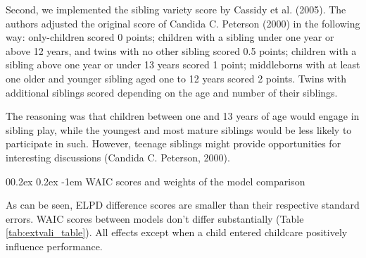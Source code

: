 \documentclass[
  man,floatsintext]{apa6}
\makeatletter
\let\oldparagraph\paragraph
\renewcommand{\paragraph}[1]{\oldparagraph{#1}\mbox{}}
\renewcommand{\paragraph}{\@startsection{paragraph}{4}{\parindent}%
  {0\baselineskip \@plus 0.2ex \@minus 0.2ex}%
  {-1em}%
  {\normalfont\normalsize\bfseries\itshape\typesectitle}}
\makeatother
\begin{document}
Second, we implemented the sibling variety score by Cassidy et al. (2005). The authors adjusted the original score of Candida C. Peterson (2000) in the following way: only-children scored 0 points; children with a sibling under one year or above 12 years, and twins with no other sibling scored 0.5 points; children with a sibling above one year or under 13 years scored 1 point; middleborns with at least one older and younger sibling aged one to 12 years scored 2 points. Twins with additional siblings scored depending on the age and number of their siblings.

The reasoning was that children between one and 13 years of age would engage in sibling play, while the youngest and most mature siblings would be less likely to participate in such. However, teenage siblings might provide opportunities for interesting discussions (Candida C. Peterson, 2000).

\hypertarget{waic-scores-and-weights-of-the-model-comparison}{%
\paragraph{WAIC scores and weights of the model comparison}\label{waic-scores-and-weights-of-the-model-comparison}}

As can be seen, ELPD difference scores are smaller than their respective standard errors. WAIC scores between models don't differ substantially (Table \ref{tab:extvali_table}). All effects except when a child entered childcare positively influence performance.
\end{document}
